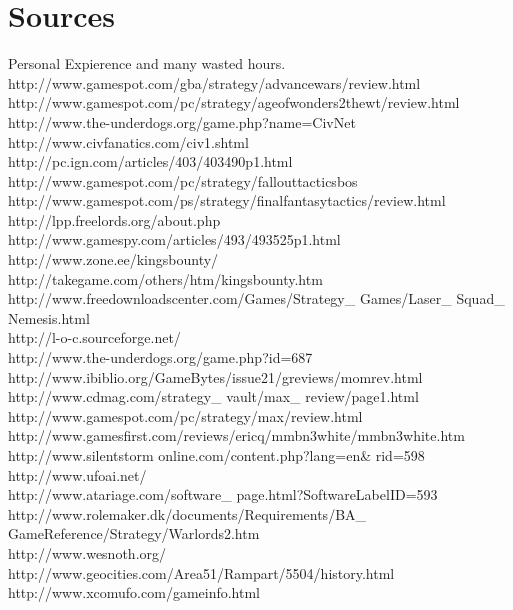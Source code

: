 \documentclass[a4paper]{article}
\begin{document}
\section{Sources}
Personal Expierence and many wasted hours.\\
http://www.gamespot.com/gba/strategy/advancewars/review.html \\
http://www.gamespot.com/pc/strategy/ageofwonders2thewt/review.html \\
http://www.the-underdogs.org/game.php?name=CivNet \\
http://www.civfanatics.com/civ1.shtml \\
http://pc.ign.com/articles/403/403490p1.html \\
http://www.gamespot.com/pc/strategy/fallouttacticsbos \\
http://www.gamespot.com/ps/strategy/finalfantasytactics/review.html \\
http://lpp.freelords.org/about.php \\
http://www.gamespy.com/articles/493/493525p1.html \\
http://www.zone.ee/kingsbounty/ \\
http://takegame.com/others/htm/kingsbounty.htm \\
http://www.freedownloadscenter.com/Games/Strategy\_ Games/Laser\_ Squad\_ Nemesis.html \\
http://l-o-c.sourceforge.net/ \\
http://www.the-underdogs.org/game.php?id=687 \\
http://www.ibiblio.org/GameBytes/issue21/greviews/momrev.html \\
http://www.cdmag.com/strategy\_ vault/max\_ review/page1.html \\
http://www.gamespot.com/pc/strategy/max/review.html \\
http://www.gamesfirst.com/reviews/ericq/mmbn3white/mmbn3white.htm \\
http://www.silentstorm\- online.com/content.php?lang=en\& rid=598 \\
http://www.ufoai.net/ \\
http://www.atariage.com/software\_ page.html?SoftwareLabelID=593 \\
http://www.rolemaker.dk/documents/Requirements/BA\_ GameReference/Strategy/Warlords2.htm \\
http://www.wesnoth.org/ \\
http://www.geocities.com/Area51/Rampart/5504/history.html \\
http://www.xcomufo.com/gameinfo.html
\end{document}
